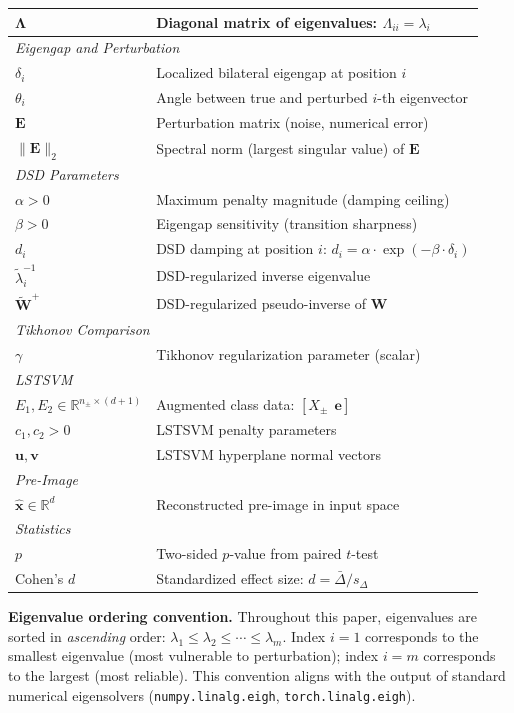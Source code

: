 \documentclass[journal]{IEEEtran}
\begin{document}
\begin{table}[!t]
\begin{tabular}{@{}p{1.4cm}p{6.2cm}@{}}
$\bm{\Lambda}$ & Diagonal matrix of eigenvalues: $\Lambda_{ii} = \lambda_i$ \\
\midrule
\multicolumn{2}{l}{\textit{Eigengap and Perturbation}} \\
$\delta_i$ & Localized bilateral eigengap at position $i$ \\
$\theta_i$ & Angle between true and perturbed $i$-th eigenvector \\
$\bm{E}$ & Perturbation matrix (noise, numerical error) \\
$\|\bm{E}\|_2$ & Spectral norm (largest singular value) of $\bm{E}$ \\
\midrule
\multicolumn{2}{l}{\textit{DSD Parameters}} \\
$\alpha > 0$ & Maximum penalty magnitude (damping ceiling) \\
$\beta > 0$ & Eigengap sensitivity (transition sharpness) \\
$d_i$ & DSD damping at position $i$: $d_i = \alpha \cdot \exp(-\beta \cdot \delta_i)$ \\
$\tilde{\lambda}_i^{-1}$ & DSD-regularized inverse eigenvalue \\
$\tilde{\bm{W}}^+$ & DSD-regularized pseudo-inverse of $\bm{W}$ \\
\midrule
\multicolumn{2}{l}{\textit{Tikhonov Comparison}} \\
$\gamma$ & Tikhonov regularization parameter (scalar) \\
\midrule
\multicolumn{2}{l}{\textit{LSTSVM}} \\
$E_1, E_2 \in \mathbb{R}^{n_\pm \times (d+1)}$ & Augmented class data: $[X_\pm ~~ \bm{e}]$ \\
$c_1, c_2 > 0$ & LSTSVM penalty parameters \\
$\bm{u}, \bm{v}$ & LSTSVM hyperplane normal vectors \\
\midrule
\multicolumn{2}{l}{\textit{Pre-Image}} \\
$\hat{\bm{x}} \in \mathbb{R}^d$ & Reconstructed pre-image in input space \\
\midrule
\multicolumn{2}{l}{\textit{Statistics}} \\
$p$ & Two-sided $p$-value from paired $t$-test \\
Cohen's $d$ & Standardized effect size: $d = \bar{\Delta} / s_\Delta$ \\
\bottomrule
\end{tabular}
\end{table}

\textbf{Eigenvalue ordering convention.} Throughout this paper, eigenvalues are sorted in \emph{ascending} order: $\lambda_1 \leq \lambda_2 \leq \cdots \leq \lambda_m$. Index $i{=}1$ corresponds to the smallest eigenvalue (most vulnerable to perturbation); index $i{=}m$ corresponds to the largest (most reliable). This convention aligns with the output of standard numerical eigensolvers (\texttt{numpy.linalg.eigh}, \texttt{torch.linalg.eigh}).
\end{document}
